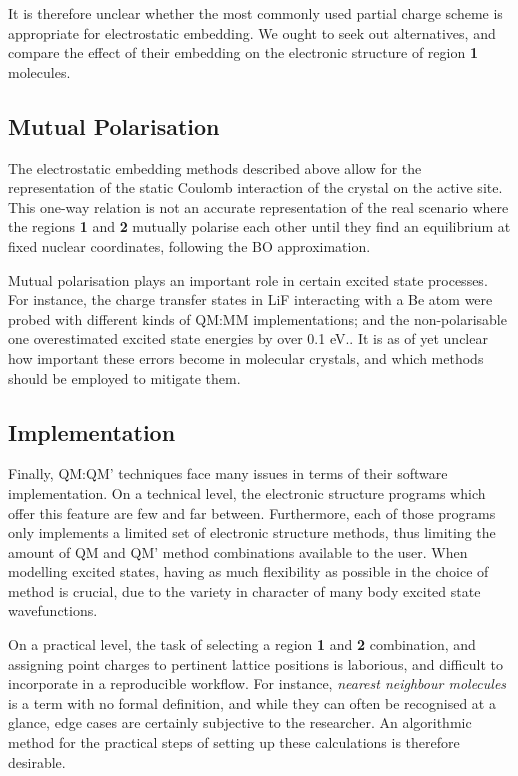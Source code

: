 It is therefore unclear whether the most commonly used partial charge scheme is appropriate for electrostatic embedding. We ought to seek out alternatives, and compare the effect of their embedding on the electronic structure of region \textbf{1} molecules.

\subsection{Mutual Polarisation}
\label{sec:prob_sc}
The electrostatic embedding methods described above allow for the representation of the static Coulomb interaction of the crystal on the active site. This one-way relation is not an accurate representation of the real scenario where the regions \textbf{1} and \textbf{2} mutually polarise each other until they find an equilibrium at fixed nuclear coordinates, following the BO approximation.

Mutual polarisation plays an important role in certain excited state processes. For instance, the charge transfer states in LiF interacting with a Be atom were probed with different kinds of QM:MM implementations; and the non-polarisable one overestimated excited state energies by over 0.1 eV.\cite{hagras_polarizable_2018}. It is as of yet unclear how important these errors become in molecular crystals, and which methods should be employed to mitigate them. 

\subsection{Implementation}
\label{sec:prob_imp}
Finally, QM:QM' techniques face many issues in terms of their software implementation. On a technical level, the electronic structure programs which offer this feature are few and far between. Furthermore, each of those programs only implements a limited set of electronic structure methods, thus limiting the amount of QM and QM' method combinations available to the user. When modelling excited states, having as much flexibility as possible in the choice of method is crucial, due to the variety in character of many body excited state wavefunctions.

On a practical level, the task of selecting a region \textbf{1} and \textbf{2} combination, and assigning point charges to pertinent lattice positions is laborious, and difficult to incorporate in a reproducible workflow. For instance, \textit{nearest neighbour molecules} is a term with no formal definition, and while they can often be recognised at a glance, edge cases are certainly subjective to the researcher. An algorithmic method for the practical steps of setting up these calculations is therefore desirable.

